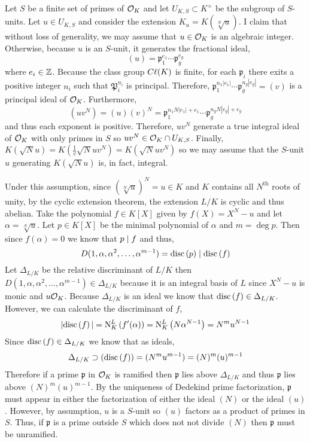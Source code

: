 \documentclass[12pt]{extarticle}
\begin{document}
Let $S$ be a finite set of primes of $\mathcal{O}_{K}$ and let $U_{K,S} \subset K^\times$ be the subgroup of $S$-units. Let $u \in U_{K,S}$ and consider the extension $K_u = K(\sqrt[N]{u})$. I claim that without loss of generality, we may assume that $u \in \mathcal{O}_{K}$ is an algebraic integer. Otherwise, because $u$ is an $S$-unit, it generates the fractional ideal,
\[ (u) = \mathfrak{p}_1^{e_1} \cdots \mathfrak{p}_g^{e_g} \]
where $e_i \in \mathbb{Z}$. Because the class group $C\ell(K)$ is finite, for each $\mathfrak{p}_i$ there exits a positive integer $n_i$ such that $\mathfrak{P}_i^{n_i}$ is principal. Therefore, $\mathfrak{p}_1^{n_1 |e_1|} \cdots \mathfrak{p}_g^{n_g |e_g|} = (v)$ is a principal ideal of $\mathcal{O}_{K}$. Furthermore,  
\[ (uv^N) = (u)(v)^N = \mathfrak{p}_1^{n_1  N |e_1| + e_1} \cdots \mathfrak{p}_g^{n_g N |e_g| + e_g} \]
and thus each exponent is positive. Therefore, $uv^N$ generate a true integral ideal of $\mathcal{O}_{K}$ with only primes in $S$ so $uv^N \in \mathcal{O}_{K} \cap U_{K,S}$. Finally, $K(\sqrt{N}{u}) = K(\frac{1}{v} \sqrt{N}{uv^N}) = K(\sqrt{N}{uv^N})$ so we may assume that the $S$-unit $u$ generating $K(\sqrt{N}{u})$ is, in fact, integral.
\par
Under this assumption, since $(\sqrt[N]{u})^N = u \in K$ and $K$ contains all $N^{\text{th}}$ roots of unity, by the cyclic extension theorem, the extension $L/K$ is cyclic and thus abelian. Take the polynomial $f \in K[X]$ given by $f(X) = X^N - u$ and let $\alpha = \sqrt[N]{u}$. Let $p \in K[X]$ be the minimal polynomial of $\alpha$ and $m = \deg{p}$. Then since $f(\alpha) = 0$ we know that $p \mid f$ and thus,
\[ D(1, \alpha, \alpha^2, \dots, \alpha^{m-1}) = \mathrm{disc}\left( p \right) \mid \mathrm{disc}\left( f \right) \]   
Let $\Delta_{L/K}$ be the relative discriminant of $L/K$ then $D(1, \alpha, \alpha^2, \dots, \alpha^{m-1}) \in \Delta_{L/K}$ because it is an integral basis of $L$ since $X^N - u$ is monic and $u \mathcal{O}_{K}$. Because $\Delta_{L/K}$ is an ideal we know that $\mathrm{disc}\left( f \right) \in \Delta_{L/K}$. However, we can calculate the discriminant of $f$,
\[ |\mathrm{disc}\left( f \right)| = \mathrm{N}^{L}_{K}\left(f'(\alpha)\right) = \mathrm{N}^{L}_{K}\left(N \alpha^{N-1}\right) = N^{m} u^{N-1} \]  
Since $\mathrm{disc}\left( f \right) \in \Delta_{L/K}$ we know that as ideals,
\[ \Delta_{L/K} \supset (\mathrm{disc}\left( f \right)) = (N^m u^{m-1}) = (N)^m (u)^{m-1}  \]
Therefore if a prime $\mathfrak{p}$ in $\mathcal{O}_{K}$ is ramified then $\mathfrak{p}$ lies above $\Delta_{L/K}$ and thus $\mathfrak{p}$ lies above $(N)^m (u)^{m-1}$. By the uniqueness of Dedekind prime factorization, $\mathfrak{p}$ must appear in either the factorization of either the ideal $(N)$ or the ideal $(u)$. However, by assumption, $u$ is a $S$-unit so $(u)$ factors as a product of primes in $S$. Thus, if $\mathfrak{p}$ is a prime outside $S$ which does not not divide $(N)$ then $\mathfrak{p}$ must be unramified. 
\end{document}
